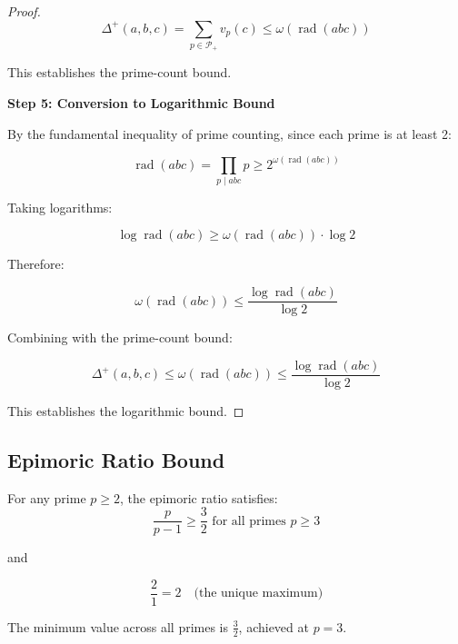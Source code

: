 \begin{proof}
\begin{equation}
\Delta^{+}(a,b,c) = \sum_{p \in \mathcal{P}_+} v_p(c) \leq \omega(\operatorname{rad}(abc))
\end{equation}

This establishes the prime-count bound.

\noindent \textbf{Step 5: Conversion to Logarithmic Bound}

By the fundamental inequality of prime counting, since each prime is at least 2:

\begin{equation}
\operatorname{rad}(abc) = \prod_{p \mid abc} p \geq 2^{\omega(\operatorname{rad}(abc))}
\end{equation}

Taking logarithms:

\begin{equation}
\log \operatorname{rad}(abc) \geq \omega(\operatorname{rad}(abc)) \cdot \log 2
\end{equation}

Therefore:

\begin{equation}
\omega(\operatorname{rad}(abc)) \leq \frac{\log \operatorname{rad}(abc)}{\log 2}
\end{equation}

Combining with the prime-count bound:

\begin{equation}
\Delta^{+}(a,b,c) \leq \omega(\operatorname{rad}(abc)) \leq \frac{\log \operatorname{rad}(abc)}{\log 2}
\end{equation}

This establishes the logarithmic bound.

\end{proof}

\subsection{Epimoric Ratio Bound}
\label{subsec:epimoric-ratio-bound}

\begin{lemma}
\label{lem:epimoric-ratio-bound}

For any prime $p \geq 2$, the epimoric ratio satisfies:
\begin{equation}
\label{eq:epimoric-ratio-bound-main}
\frac{p}{p-1} \geq \frac{3}{2} \text{ for all primes } p \geq 3
\end{equation}

and

\begin{equation}
\label{eq:epimoric-ratio-bound-two}
\frac{2}{1} = 2 \quad \text{(the unique maximum)}
\end{equation}

The minimum value across all primes is $\frac{3}{2}$, achieved at $p = 3$.

\end{lemma}

